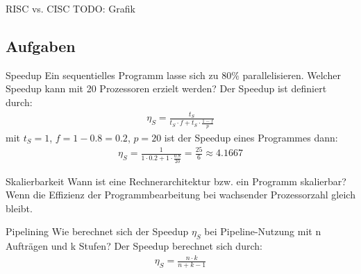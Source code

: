 \begin{example}[Pipelining]{RISC vs. CISC}
    TODO: Grafik
\end{example}

\subsection{Aufgaben}

\begin{aufgabe}{Speedup}
    Ein sequentielles Programm lasse sich zu $80\%$ parallelisieren.
    Welcher Speedup kann mit 20 Prozessoren erzielt werden?
    \tcblower
    Der Speedup ist definiert durch:
    \begin{align*}
        \eta_S = \frac{t_S}{t_S \cdot f + t_S \cdot \frac{1-f}{p}}
    \end{align*}
    mit $t_S=1$, $f=1-0.8=0.2$, $p=20$ ist der Speedup eines Programmes dann:
    \begin{align*}
        \eta_S = \frac{1}{1 \cdot 0.2 + 1 \cdot \frac{0.8}{20}} = \frac{25}{6} \approx 4.1667
    \end{align*}
\end{aufgabe}

\begin{aufgabe}{Skalierbarkeit}
    Wann ist eine Rechnerarchitektur bzw. ein Programm skalierbar?
    \tcblower
    Wenn die Effizienz der Programmbearbeitung bei wachsender Prozessorzahl gleich bleibt.
\end{aufgabe}

\begin{aufgabe}{Pipelining}
    Wie berechnet sich der Speedup $\eta_S$ bei Pipeline-Nutzung mit n Aufträgen und k Stufen?
    \tcblower
    Der Speedup berechnet sich durch:
    \begin{align*}
        \eta_S = \frac{n\cdot k}{n+k-1}
    \end{align*}
\end{aufgabe}
